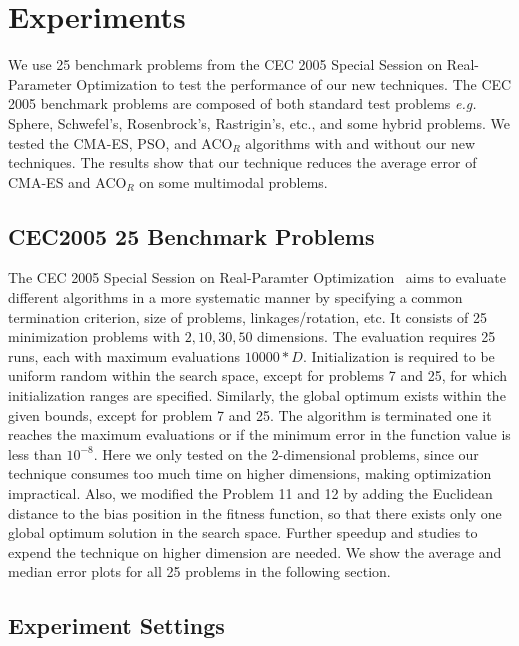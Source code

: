 \chapter{Experiments}
\label{chapter:experiments}

We use 25 benchmark problems from the CEC 2005 Special Session on Real-Parameter Optimization to test the performance of our new techniques.
The CEC 2005 benchmark problems are composed of both standard test problems \textit{e.g.} Sphere, Schwefel's, Rosenbrock's, Rastrigin's, etc.,
and some hybrid problems.
We tested the CMA-ES, PSO, and ACO$_R$ algorithms with and without our new techniques.
The results show that our technique reduces the average error of CMA-ES and ACO$_R$ on some multimodal problems.  

\section{CEC2005 25 Benchmark Problems}

The CEC 2005 Special Session on Real-Paramter Optimization~\cite{Suganthan:2005:benchmark} aims to evaluate different algorithms in a more systematic manner by specifying a common termination criterion, size of problems, linkages/rotation, etc.
It consists of 25 minimization problems with $2, 10, 30, 50$ dimensions.
The evaluation requires 25 runs, each with maximum evaluations $10000 * D$. 
Initialization is required to be uniform random within the search space, except for problems 7 and 25, for which initialization ranges are specified.
Similarly, the global optimum exists within the given bounds, except for problem 7 and 25.
The algorithm is terminated one it reaches the maximum evaluations or if the minimum error in the function value is less than $10^{-8}$.
Here we only tested on the 2-dimensional problems, 
since our technique consumes too much time on higher dimensions, 
making optimization impractical.  
Also, we modified the Problem 11 and 12 by adding the Euclidean distance to the bias position in the fitness function,
so that there exists only one global optimum solution in the search space.
Further speedup and studies to expend the technique on higher dimension are needed.
We show the average and median error plots for all 25 problems in the following section.


\section{Experiment Settings}

